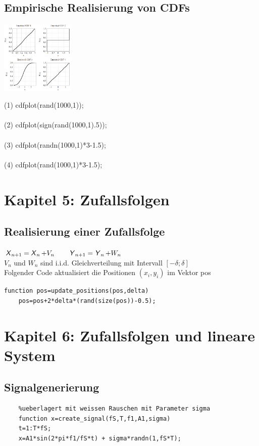 \documentclass[deutsch]{latex4ei/latex4ei_sheet}
\begin{document}
\begin{sectionbox}
	\subsection{Empirische Realisierung von CDFs}	
	\parbox{3.5cm}{
		\includegraphics[width = 3.5cm]{img/cdf-sample.png}
	}
	\parbox{3.5cm}{
		(1)	cdfplot(rand(1000,1)); \\\\
		(2)	cdfplot(sign(rand(1000,1).5)); \\\\
		(3)	cdfplot(randn(1000,1)*3-1.5); \\\\
		(4)	cdfplot(rand(1000,1)*3-1.5);
		}
\end{sectionbox}

\section{Kapitel 5: Zufallsfolgen}
\begin{sectionbox}
	\subsection{Realisierung einer Zufallsfolge}
	$\operatorname{\textsf{\textit{X}}}_{n+1}=\operatorname{\textsf{\textit{X}}}_n+V_n \qquad \operatorname{\textsf{\textit{Y}}}_{n+1}=\operatorname{\textsf{\textit{Y}}}_n+W_n$ \\
	$V_n$ und $W_n$ sind i.i.d. Gleichverteilung mit Intervall $[-\delta;\delta]$\\
	Folgender Code aktualisiert die Positionen $(x_i,y_i)$ im Vektor pos
	\begin{lstlisting}[gobble=4]
	function pos=update_positions(pos,delta)
	pos=pos+2*delta*(rand(size(pos))-0.5);
	\end{lstlisting}
\end{sectionbox}

\section{Kapitel 6: Zufallsfolgen und lineare System}
\begin{sectionbox}
	\subsection{Signalgenerierung}
	\begin{lstlisting}[gobble=4]
	%Erstellt Sinussignal der Frequenz f1 mit der Amplitude A1,
	%ueberlagert mit weissen Rauschen mit Parameter sigma
	function x=create_signal(fS,T,f1,A1,sigma)
	t=1:T*fS;
	x=A1*sin(2*pi*f1/fS*t) + sigma*randn(1,fS*T);
	\end{lstlisting}
\end{sectionbox}

\end{document}

